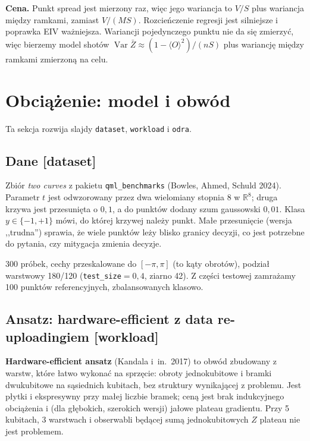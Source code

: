 \documentclass[11pt,a4paper]{article}
\newcommand{\slid}[1]{\hfill{\normalfont\small\ttfamily\color{axbluedk}[#1]}}
\newcommand{\ev}[1]{\langle #1\rangle}
\newcommand{\Var}{\operatorname{Var}}
\begin{document}
\textbf{Cena.} Punkt spread jest mierzony raz, więc jego wariancja to $V/S$ plus wariancja między
ramkami, zamiast $V/(MS)$. Rozcieńczenie regresji jest silniejsze i poprawka EIV ważniejsza.
Wariancji pojedynczego punktu nie da się zmierzyć, więc bierzemy model shotów
$\Var\bar Z\approx(1-\ev O^2)/(nS)$ plus wariancję między ramkami zmierzoną na celu.

\section{Obciążenie: model i obwód}

Ta sekcja rozwija slajdy \texttt{dataset}, \texttt{workload} i \texttt{odra}.

\subsection{Dane \slid{dataset}}

Zbiór \emph{two curves} z pakietu \texttt{qml\_benchmarks} (Bowles, Ahmed, Schuld 2024). Parametr
$t$ jest odwzorowany przez dwa wielomiany stopnia 8 w $\mathbb R^8$; druga krzywa jest przesunięta
o $0{,}1$, a do punktów dodany szum gaussowski $0{,}01$. Klasa $y\in\{-1,+1\}$ mówi, do której
krzywej należy punkt. Małe przesunięcie (wersja ,,trudna'') sprawia, że wiele punktów leży blisko
granicy decyzji, co jest potrzebne do pytania, czy mitygacja zmienia decyzje.

300 próbek, cechy przeskalowane do $[-\pi,\pi]$ (to kąty obrotów), podział warstwowy 180/120
(\texttt{test\_size}$=0{,}4$, ziarno 42). Z części testowej zamrażamy 100 punktów referencyjnych,
zbalansowanych klasowo.

\subsection{Ansatz: hardware-efficient z data re-uploadingiem \slid{workload}}

\textbf{Hardware-efficient ansatz} (Kandala i~in.\ 2017) to obwód zbudowany z warstw, które
łatwo wykonać na sprzęcie: obroty jednokubitowe i bramki dwukubitowe na sąsiednich kubitach, bez
struktury wynikającej z problemu. Jest płytki i ekspresywny przy małej liczbie bramek; ceną jest
brak indukcyjnego obciążenia i (dla głębokich, szerokich wersji) jałowe plateau gradientu. Przy 5
kubitach, 3 warstwach i obserwabli będącej sumą jednokubitowych $Z$ plateau nie jest problemem.
\end{document}
